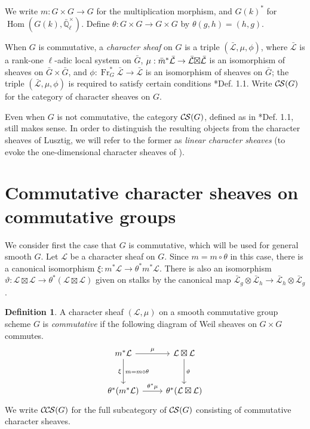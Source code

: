 \documentclass[10pt]{amsart}
\theoremstyle{plain}
\theoremstyle{definition}
\newtheorem{definition}[theorem]{Definition}
\newcommand{\EE}{\mathbb{\bar Q}_\ell}
\newcommand{\EEx}{\EE^\times}
\newcommand{\Frob}[1]{\operatorname{Fr}_{#1}}
\DeclareMathOperator{\Hom}{Hom}
\newcommand{\cs}[1]{{\mathcal{#1}}}
\newcommand{\gcs}[1]{{\mathcal{\bar #1}}}
\newcommand{\CS}{{\mathcal{C\hskip-0.8pt S}}}
\newcommand{\CCS}{{\mathcal{C\hskip-.8pt C\hskip-0.8pt S}}}
\newcommand{\bm}{\bar{m}}
\newcommand{\bG}{\bar{G}}
\newcommand{\tight}[3]{\hspace{-#1pt}{#2}\hspace{-#3pt}}
\newcommand{\LxL}{\text{$\gcs{L} \tight{0}{\boxtimes}{0} \gcs{L}$}}
\begin{document}
We write $m : G \times G \to G$ for the multiplication morphism, and $G(k)^*$ for $\Hom(G(k), \EEx)$.
Define $\theta : G\times G \to G\times G$ by $\theta(g,h) = (h,g)$.

When $G$ is commutative, a \emph{character sheaf} on $G$ is a triple $(\gcs{L}, \mu, \phi)$,
where $\gcs{L}$ is a rank-one $\ell$-adic local system on $\bG$, 
$\mu : \bm^* \gcs{L} \to \LxL$ is an isomorphism
of sheaves on $\bG \times \bG$, 
and $\phi : \Frob{G}^* \gcs{L} \to \gcs{L}$ is an isomorphism of sheaves on $\bG$;
the triple $(\gcs{L}, \mu, \phi)$ is required to satisfy certain conditions \cite{cunningham-roe:13a}*{Def. 1.1}.
Write $\CS(G)$ for the category of character sheaves on $G$.

Even when $G$ is not commutative, the category $\CS(G)$, defined as in \cite{cunningham-roe:13a}*{Def. 1.1},
still makes sense.  In order to distinguish the resulting objects from
the character sheaves of Lusztig, we will refer to the former as \emph{linear character sheaves}
(to evoke the one-dimensional character sheaves of \cite{kamgarpour:09a}).

\section{Commutative character sheaves on commutative groups}\label{sec:comcom}

We consider first the case that $G$ is commutative, which will be used for general smooth $G$.
Let $\cs{L}$ be a character sheaf on $G$.  Since $m = m \circ \theta$ in this case,
there is a canonical isomorphism $\xi : m^* \cs{L} \to \theta^* m^* \cs{L}$.
There is also an isomorphism $\vartheta : \cs{L}\boxtimes\cs{L} \to \theta^*(\cs{L}\boxtimes\cs{L})$
given on stalks by the canonical map $\gcs{L}_{g} \otimes \gcs{L}_{h} \to \gcs{L}_{h} \otimes \gcs{L}_{g}$.

\begin{definition}\label{def:CCScom}
A character sheaf $(\cs{L}, \mu)$ on a smooth commutative group scheme $G$ is \emph{commutative}
if the following diagram of Weil sheaves on $G \times G$ commutes.
  \[
  \begin{tikzcd}[row sep=30]
   m^*\cs{L} \arrow{d}[swap]{\xi}{m= m\circ\theta} \arrow{r}{\mu} & \cs{L}\boxtimes\cs{L} \arrow{d}{\vartheta}\\
   \theta^*(m^*\cs{L}) \arrow{r}{{\theta}^*\mu} &  \theta^*(\cs{L}\boxtimes\cs{L})
  \end{tikzcd}
  \]
We write $\CCS(G)$ for the full subcategory of $\CS(G)$ consisting of commutative character sheaves.
 \end{definition}
\end{document}
